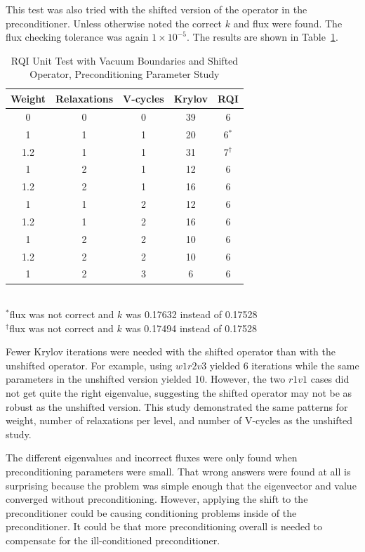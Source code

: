 This test was also tried with the shifted version of the operator in the preconditioner. Unless otherwise noted the correct $k$ and flux were found. The flux checking tolerance was again $1 \times 10^{-5}$. The results are shown in Table~\ref{table:RQIUnitTestVacShifted}.
%
\begin{table}[!h]
\caption{RQI Unit Test with Vacuum Boundaries and Shifted Operator, Preconditioning Parameter Study}
\begin{center}
\begin{tabular}{c c c c c}
\hline
Weight & Relaxations & V-cycles & Krylov & RQI \\[0.5ex]
\hline
0    & 0 & 0 & 39 & 6 \\
1    & 1 & 1 & 20 & 6$^{*}$ \\
1.2 & 1 & 1 & 31 & 7$^{\dag}$ \\
1    & 2 & 1 & 12 & 6 \\
1.2 & 2 & 1 & 16 & 6 \\
1    & 1 & 2 & 12 & 6 \\
1.2 & 1 & 2 & 16 & 6 \\
1    & 2 & 2 & 10 & 6 \\
1.2 & 2 & 2 & 10 & 6 \\
1    & 2 & 3 & 6   & 6 \\
\hline 
\end{tabular}\\
$^{*}$flux was not correct and $k$ was 0.17632 instead of 0.17528 \\
 $^{\dag}$flux was not correct and $k$ was 0.17494 instead of 0.17528
\end{center}
\label{table:RQIUnitTestVacShifted}
\end{table}

Fewer Krylov iterations were needed with the shifted operator than with the unshifted operator. For example, using $w1r2v3$ yielded 6 iterations while the same parameters in the unshifted version yielded 10. However, the two $r1v1$ cases did not get quite the right eigenvalue, suggesting the shifted operator may not be as robust as the unshifted version. This study demonstrated the same patterns for weight, number of relaxations per level, and number of V-cycles as the unshifted study. 

The different eigenvalues and incorrect fluxes were only found when preconditioning parameters were small. That wrong answers were found at all is surprising because the problem was simple enough that the eigenvector and value converged without preconditioning. However, applying the shift to the preconditioner could be causing conditioning problems inside of the preconditioner. It could be that more preconditioning overall is needed to compensate for the ill-conditioned preconditioner.  

